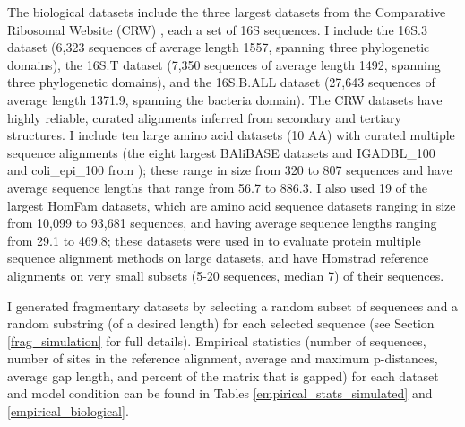 The biological datasets include the three largest 
datasets from the
Comparative Ribosomal Website (CRW)  \cite{Cannone2002}, each
a set of 16S sequences. I include
the 16S.3 dataset (6,323 sequences of average length 1557,  spanning three phylogenetic domains), the 
16S.T dataset (7,350 sequences of average length 1492,  spanning three phylogenetic domains), 
and the 
16S.B.ALL dataset (27,643 sequences of average length 1371.9,  spanning the bacteria domain).  
The CRW datasets have highly reliable, curated alignments inferred 
from secondary and tertiary structures.  
I include ten 
large amino acid
datasets (10 AA) with curated multiple sequence alignments (the eight 
largest
BAliBASE datasets \cite{Thompson2011}
and IGADBL\_100 and coli\_epi\_100 from \cite{Gloor2005}); these
range in 
size from
 320 to 807 sequences and have average
sequence lengths that range from 56.7 to 886.3.
I also used 19 of the largest HomFam datasets, which are amino acid 
sequence datasets ranging in size from 
10,099 to 93,681 sequences,  and
having average sequence lengths ranging
from 29.1 to 469.8;
these datasets 
were used in \cite{Sievers2011} to evaluate protein multiple
sequence alignment methods on large datasets, and have
Homstrad \cite{homstrad} reference alignments
on very small subsets (5-20 sequences, median 7) of their sequences.

I generated fragmentary datasets by selecting 
a random subset of sequences and a random substring (of a desired
length) for each selected sequence (see 
Section \ref{frag_simulation} for full details).
Empirical statistics (number of sequences, number of sites in the reference alignment,
average and maximum p-distances, average
gap length, and percent of the matrix that is gapped) for each dataset 
and  model condition
can be found in Tables \ref{empirical_stats_simulated} and \ref{empirical_biological}.

